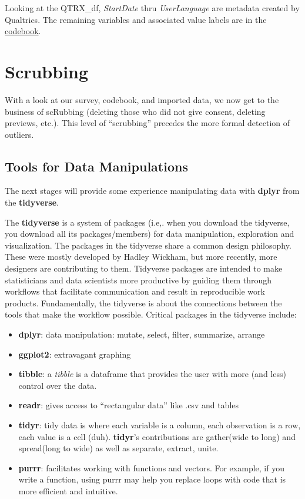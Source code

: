 \documentclass[
  11pt,
]{book}
\providecommand{\tightlist}{%
  \setlength{\itemsep}{0pt}\setlength{\parskip}{0pt}}
\begin{document}
Looking at the QTRX\_df, \emph{StartDate} thru \emph{UserLanguage} are metadata created by Qualtrics. The remaining variables and associated value labels are in the \href{./Rate-a-Course_Codebook.pdf}{codebook}.

\hypertarget{scrubbing}{%
\section{Scrubbing}\label{scrubbing}}

With a look at our survey, codebook, and imported data, we now get to the business of scRubbing (deleting those who did not give consent, deleting previews, etc.). This level of ``scrubbing'' precedes the more formal detection of outliers.

\hypertarget{tools-for-data-manipulations}{%
\subsection{Tools for Data Manipulations}\label{tools-for-data-manipulations}}

The next stages will provide some experience manipulating data with \textbf{dplyr} from the \textbf{tidyverse}.

The \textbf{tidyverse} is a system of packages (i.e,. when you download the tidyverse, you download all its packages/members) for data manipulation, exploration and visualization. The packages in the tidyverse share a common design philosophy. These were mostly developed by Hadley Wickham, but more recently, more designers are contributing to them. Tidyverse packages are intended to make statisticians and data scientists more productive by guiding them through workflows that facilitate communication and result in reproducible work products. Fundamentally, the tidyverse is about the connections between the tools that make the workflow possible. Critical packages in the tidyverse include:

\begin{itemize}
\tightlist
\item
  \textbf{dplyr}: data manipulation: mutate, select, filter, summarize, arrange
\item
  \textbf{ggplot2}: extravagant graphing
\item
  \textbf{tibble}: a \emph{tibble} is a dataframe that provides the user with more (and less) control over the data.
\item
  \textbf{readr}: gives access to ``rectangular data'' like .csv and tables
\item
  \textbf{tidyr}: tidy data is where each variable is a column, each observation is a row, each value is a cell (duh). \textbf{tidyr}'s contributions are gather(wide to long) and spread(long to wide) as well as separate, extract, unite.
\item
  \textbf{purrr}: facilitates working with functions and vectors. For example, if you write a function, using purrr may help you replace loops with code that is more efficient and intuitive.
\end{itemize}
\end{document}
